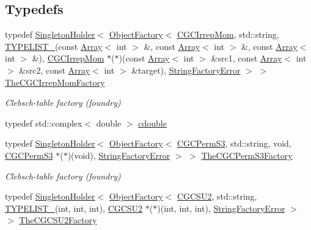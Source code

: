 \subsection*{Typedefs}
\begin{DoxyCompactItemize}
\item 
typedef \mbox{\hyperlink{classUtil_1_1SingletonHolder}{Singleton\+Holder}}$<$ \mbox{\hyperlink{classUtil_1_1ObjectFactory}{Object\+Factory}}$<$ \mbox{\hyperlink{classHadron_1_1CGCIrrepMom}{C\+G\+C\+Irrep\+Mom}}, std\+::string, \mbox{\hyperlink{adat__devel__install_2include_2adat_2typelist_8h_a0309f68a543c5c0994f9edc0e56dc59f}{T\+Y\+P\+E\+L\+I\+S\+T\+\_}}(const \mbox{\hyperlink{classXMLArray_1_1Array}{Array}}$<$ int $>$ \&, const \mbox{\hyperlink{classXMLArray_1_1Array}{Array}}$<$ int $>$ \&, const \mbox{\hyperlink{classXMLArray_1_1Array}{Array}}$<$ int $>$ \&), \mbox{\hyperlink{classHadron_1_1CGCIrrepMom}{C\+G\+C\+Irrep\+Mom}} $\ast$($\ast$)(const \mbox{\hyperlink{classXMLArray_1_1Array}{Array}}$<$ int $>$ \&src1, const \mbox{\hyperlink{classXMLArray_1_1Array}{Array}}$<$ int $>$ \&src2, const \mbox{\hyperlink{classXMLArray_1_1Array}{Array}}$<$ int $>$ \&target), \mbox{\hyperlink{structUtil_1_1StringFactoryError}{String\+Factory\+Error}} $>$ $>$ \mbox{\hyperlink{namespaceHadron_a4657a351a06d86fb997a0765f97e3f13}{The\+C\+G\+C\+Irrep\+Mom\+Factory}}
\begin{DoxyCompactList}\small\item\em Clebsch-\/table factory (foundry) \end{DoxyCompactList}\item 
typedef std\+::complex$<$ double $>$ \mbox{\hyperlink{namespaceHadron_abaab2f90393b8dd8d93060e6ce6568e7}{cdouble}}
\item 
typedef \mbox{\hyperlink{classUtil_1_1SingletonHolder}{Singleton\+Holder}}$<$ \mbox{\hyperlink{classUtil_1_1ObjectFactory}{Object\+Factory}}$<$ \mbox{\hyperlink{classHadron_1_1CGCPermS3}{C\+G\+C\+Perm\+S3}}, std\+::string, void, \mbox{\hyperlink{classHadron_1_1CGCPermS3}{C\+G\+C\+Perm\+S3}} $\ast$($\ast$)(void), \mbox{\hyperlink{structUtil_1_1StringFactoryError}{String\+Factory\+Error}} $>$ $>$ \mbox{\hyperlink{namespaceHadron_a5dba98c73cf8d3f64496a084c7e3d16c}{The\+C\+G\+C\+Perm\+S3\+Factory}}
\begin{DoxyCompactList}\small\item\em Clebsch-\/table factory (foundry) \end{DoxyCompactList}\item 
typedef \mbox{\hyperlink{classUtil_1_1SingletonHolder}{Singleton\+Holder}}$<$ \mbox{\hyperlink{classUtil_1_1ObjectFactory}{Object\+Factory}}$<$ \mbox{\hyperlink{classHadron_1_1CGCSU2}{C\+G\+C\+S\+U2}}, std\+::string, \mbox{\hyperlink{adat__devel__install_2include_2adat_2typelist_8h_a0309f68a543c5c0994f9edc0e56dc59f}{T\+Y\+P\+E\+L\+I\+S\+T\+\_}}(int, int, int), \mbox{\hyperlink{classHadron_1_1CGCSU2}{C\+G\+C\+S\+U2}} $\ast$($\ast$)(int, int, int), \mbox{\hyperlink{structUtil_1_1StringFactoryError}{String\+Factory\+Error}} $>$ $>$ \mbox{\hyperlink{namespaceHadron_a78329899af02f016ab89457f10d6e6ff}{The\+C\+G\+C\+S\+U2\+Factory}}

\end{DoxyCompactItemize}

